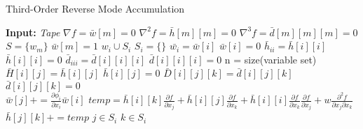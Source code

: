 \documentclass[oneside]{article}
\begin{document}
\begin{algorithm*}[!htb]
  \caption{Third-Order Reverse Mode Accumulation}
  \begin{algorithmic}[1]
\State \textbf{Input:} \textit{Tape} 
\State $\nabla f = \bar{w}[m] = 0$ 
\State $\nabla^2 f =  \bar{h}[m][m] = 0$ 
\State $\nabla^3 f =  \bar{d}[m][m][m] = 0$ \\

\State $S = \{w_m\}$
\State $\bar{w}[m] = 1$
\State $w_i \cup S_i$
\State $S_i = \{ \}$
\State $\bar{w_i}=\bar{w}[i]$
\State $\bar{w}[i] = 0$
\State $\bar{h}_{ii}=\bar{h}[i][i]$
\State $\bar{h}[i][i] = 0$
\State $\bar{d}_{iii}=\bar{d}[i][i][i]$
\State $\bar{d}[i][i][i] = 0$
\State n = size(variable set) \\
\State $\bar{H}[i][j] = \bar{h}[i][j]$
\State $\bar{h}[i][j] = 0$
\State $\bar{D}[i][j][k] = \bar{d}[i][j][k]$
\State $\bar{d}[i][j][k] = 0$
\EndFor
\EndFor \\
\State $\bar{w}[j] +=  \frac{\partial \phi_i}{\partial x_i}\bar{w}[i]$
\State  $temp =  \bar{h}[i][k]  \frac{\partial f}{\partial x_j} + \bar{h}[i][j]  \frac{\partial f}{\partial x_k}+\bar{h}[i][i]  \frac{\partial f}{\partial x_k} \frac{\partial f}{\partial x_j} + w\frac{\partial^2 f}{\partial x_j \partial x_k}$
\State  $\bar{h}[j][k] += temp$
\State  $j \in S_i$
\State  $k \in S_i$
\EndIf
{}
\State  {}
\end{algorithmic}
\end{algorithm*}
\end{document}
